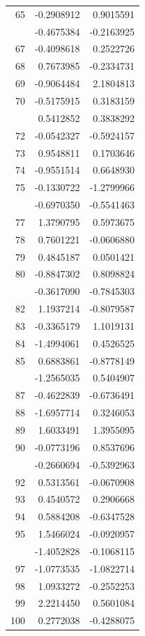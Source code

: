 \documentclass[
  japanese,
  letterpaper,
  DIV=11,
  numbers=noendperiod]{scrartcl}
\begin{document}
\begin{longtable}[t]{rrr}
65 & -0.2908912 & 0.9015591\\
\addlinespace
66 & -0.4675384 & -0.2163925\\
67 & -0.4098618 & 0.2522726\\
68 & 0.7673985 & -0.2334731\\
69 & -0.9064484 & 2.1804813\\
70 & -0.5175915 & 0.3183159\\
\addlinespace
71 & 0.5412852 & 0.3838292\\
72 & -0.0542327 & -0.5924157\\
73 & 0.9548811 & 0.1703646\\
74 & -0.9551514 & 0.6648930\\
75 & -0.1330722 & -1.2799966\\
\addlinespace
76 & -0.6970350 & -0.5541463\\
77 & 1.3790795 & 0.5973675\\
78 & 0.7601221 & -0.0606880\\
79 & 0.4845187 & 0.0501421\\
80 & -0.8847302 & 0.8098824\\
\addlinespace
81 & -0.3617090 & -0.7845303\\
82 & 1.1937214 & -0.8079587\\
83 & -0.3365179 & 1.1019131\\
84 & -1.4994061 & 0.4526525\\
85 & 0.6883861 & -0.8778149\\
\addlinespace
86 & -1.2565035 & 0.5404907\\
87 & -0.4622839 & -0.6736491\\
88 & -1.6957714 & 0.3246053\\
89 & 1.6033491 & 1.3955095\\
90 & -0.0773196 & 0.8537696\\
\addlinespace
91 & -0.2660694 & -0.5392963\\
92 & 0.5313561 & -0.0670908\\
93 & 0.4540572 & 0.2906668\\
94 & 0.5884208 & -0.6347528\\
95 & 1.5466024 & -0.0920957\\
\addlinespace
96 & -1.4052828 & -0.1068115\\
97 & -1.0773535 & -1.0822714\\
98 & 1.0933272 & -0.2552253\\
99 & 2.2214450 & 0.5601084\\
100 & 0.2772038 & -0.4288075\\

\end{longtable}
\end{document}
